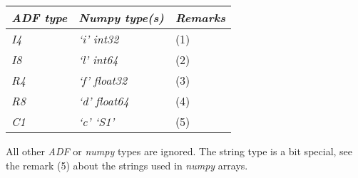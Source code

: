 \documentclass[a4paper,10pt,english]{sphinxmanual}
\begin{document}
\begin{tabulary}{\linewidth}{|L|L|L|}
\hline
\textbf{
\emph{ADF type}
} & \textbf{
\emph{Numpy type(s)}
} & \textbf{
\emph{Remarks}
}\\
\hline

\emph{I4}
 & 
\emph{`i' int32}
 & 
(1)
\\

\emph{I8}
 & 
\emph{`l' int64}
 & 
(2)
\\

\emph{R4}
 & 
\emph{`f' float32}
 & 
(3)
\\

\emph{R8}
 & 
\emph{`d' float64}
 & 
(4)
\\

\emph{C1}
 & 
\emph{`c' `\textbar{}S1'}
 & 
(5)
\\
\hline
\end{tabulary}


All other \emph{ADF} or \emph{numpy} types are ignored. The string type is a bit special,
see the remark (5) about the strings used in \emph{numpy} arrays.
\end{document}

